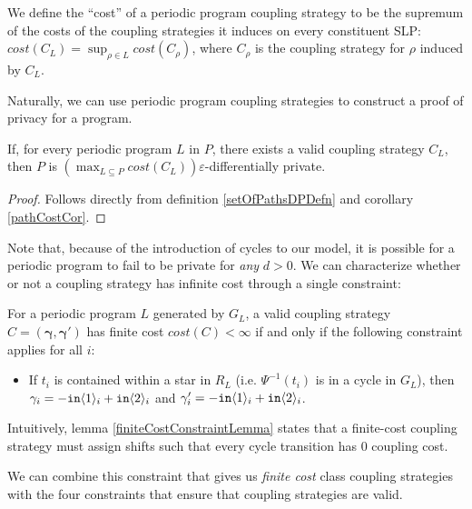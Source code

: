 We define the ``cost'' of a periodic program coupling strategy to be the supremum of the costs of the coupling strategies it induces on every constituent SLP: $cost(C_L) = \sup_{\rho\in L}cost(C_\rho)$, where $C_\rho$ is the coupling strategy for $\rho$ induced by $C_L$. 

Naturally, we can use periodic program coupling strategies to construct a proof of privacy for a program.

\begin{lemma}
    If, for every periodic program $L$ in $P$, there exists a valid coupling strategy $C_L$, then $P$ is $(\max_{L\subseteq P} cost(C_L))\varepsilon$-differentially private.
\end{lemma}

\begin{proof}
    Follows directly from definition \ref{setOfPathsDPDefn} and corollary \ref{pathCostCor}.
\end{proof}


Note that, because of the introduction of cycles to our model, it is possible for a periodic program to fail to be private for \textit{any} $d>0$. We can characterize whether or not a coupling strategy has infinite cost through a single constraint:

\begin{lemma}\label{finiteCostConstraintLemma}
    For a periodic program $L$ generated by $G_L$, a valid coupling strategy $C = (\mathbf{\gamma}, \mathbf{\gamma}')$ has finite cost $cost(C)<\infty$ if and only if the following constraint applies for all $i$:
    \begin{itemize}
        \item If $t_i$ is contained within a star in $R_L$ (i.e. $\Psi^{-1}(t_i)$ is in a cycle in $G_L$), then $\gamma_i = -\texttt{in}\langle1 \rangle_i+\texttt{in}\langle2 \rangle_i$ and $\gamma_i' = -\texttt{in}\langle1 \rangle_i+\texttt{in}\langle2 \rangle_i$.
    \end{itemize}
\end{lemma}

Intuitively, lemma \ref{finiteCostConstraintLemma} states that a finite-cost coupling strategy must assign shifts such that every cycle transition has 0 coupling cost. 

We can combine this constraint that gives us \textit{finite cost} class coupling strategies with the four constraints that ensure that coupling strategies are valid. 

